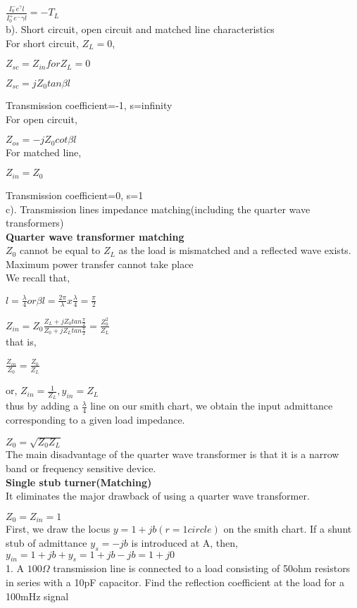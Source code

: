 \documentclass[10pt,a4paper]{report}
\begin{document}
$\frac{I_{0}^- e^\gamma l}{I_{0}^+ e^-\gamma l}=-T_{L}$\\
b). Short circuit, open circuit and matched line characteristics\\

For short circuit, 
$Z_{L}=0$, 

$Z_{sc}=Z_{in} for Z_{L}=0$

$Z_{sc}=jZ_{0}tan\beta l$

Transmission coefficient=-1, s=infinity\\

For open circuit, 

$Z_{os}=-jZ_{0}cot\beta l$\\

For matched line, 

$Z_{in}=Z_{0}$

Transmission coefficient=0, s=1\\
c). Transmission lines impedance matching(including the quarter wave transformers)\\
\textbf{Quarter wave transformer matching}\\
$Z_{0}$ cannot be equal to $Z_{L}$ as the load is mismatched and a reflected wave exists. Maximum power transfer cannot take place\\
We recall that,

$l=\frac{\lambda}{4} or \beta l=\frac{2\pi}{\lambda}x\frac{\lambda}{4}=\frac{\pi}{2}$

$Z_{in}=Z_{0}\frac{Z_{L}+jZ_{0}tan\frac{\pi}{2}}{Z_{0}+jZ_{L}tan\frac{\pi}{2}}=\frac{Z_{0}^2}{Z_{L}}$\\

that is,

$\frac{Z_{in}}{Z_{0}}=\frac{Z_{0}}{Z_{L}}$

or, $Z_{in}=\frac{1}{Z_{L}}, y_{in}=Z_{L}$\\
thus by adding a $\frac{\lambda}{4}$ line on our smith chart, we obtain the input admittance corresponding to a given load impedance.

$Z_{0}=\sqrt{Z_{0}Z_{L}}$\\
The main disadvantage of the quarter wave transformer is that it is a narrow band or frequency sensitive device.\\
\textbf{Single stub turner(Matching)}\\
It eliminates the major drawback of using a quarter wave transformer.

$Z_{0}=Z_{in}=1$\\
First, we draw the locus $y=1+jb(r=1 circle)$ on the smith chart. If a shunt stub of admittance $y_{s}=-jb$ is introduced at A, then, $y_{in}=1+jb+y_{s}=1+jb-jb=1+j0$\\
1. A $100\Omega$ transmission line is connected to a load consisting of 50ohm resistors in series with a 10pF capacitor. Find the reflection coefficient at the load for a 100mHz signal
\end{document}
